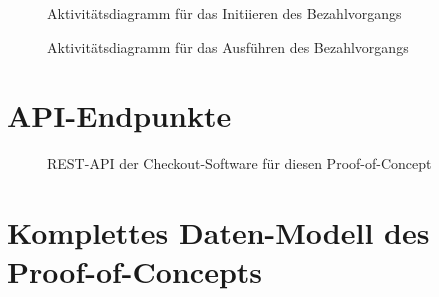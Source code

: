\begin{figure}[h!]
	\centering
	
	\caption{Aktivitätsdiagramm für das Initiieren des Bezahlvorgangs }
	\label{fig:SL-InitPayment}
\end{figure}

\begin{figure}[h!]
	\centering
	
	\caption{Aktivitätsdiagramm für das Ausführen des Bezahlvorgangs }
	\label{fig:SL-ExecPayment}
\end{figure}

\section{API-Endpunkte}

\begin{figure}[h!]
	\centering
	
	\caption{REST-API der Checkout-Software für diesen Proof-of-Concept}
	\label{fig:REST-API}
\end{figure}

\section{Komplettes Daten-Modell des Proof-of-Concepts} \label{label:Daten-Modell}

